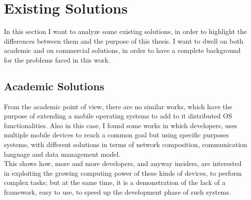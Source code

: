 \section{Existing Solutions}\label{existings}
In this section I want to analyze some existing solutions, in order to highlight the differences between them and the purpose of this thesis. I want to dwell on both academic and on commercial solutions, in order to have a complete background for the problems faced in this work.
\subsection{Academic Solutions}
From the academic point of view, there are no similar works, which have the purpose of extending a mobile operating systems to add to it distributed OS functionalities. Also in this case, I found some works in which developers, uses multiple mobile devices to reach a common goal but using specific purposes systems, with different solutions in terms of network composition, communication language and data management model.\\
This shows how, more and more developers, and anyway insiders, are interested in exploiting the growing computing power of these kinds of devices, to perform complex tasks; but at the same time, it is a demonstration of the lack of a framework, easy to use, to speed up the development phase of such systems.
